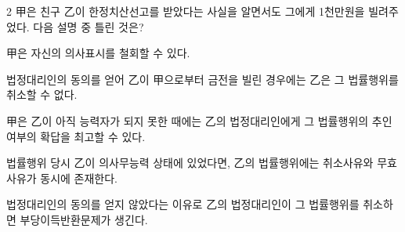 \begin{question}{2}
甲은 친구 乙이 한정치산선고를 받았다는 사실을 알면서도 그에게 1천만원을 빌려주었다. 다음 설명 중 틀린 것은?
\begin{choices}
  \item 甲은 자신의 의사표시를 철회할 수 있다.
  \item 법정대리인의 동의를 얻어 乙이 甲으로부터 금전을 빌린 경우에는 乙은 그 법률행위를 취소할 수 없다.
  \item 甲은 乙이 아직 능력자가 되지 못한 때에는 乙의 법정대리인에게 그 법률행위의 추인여부의 확답을 최고할 수 있다.
  \item 법률행위 당시 乙이 의사무능력 상태에 있었다면, 乙의 법률행위에는 취소사유와 무효사유가 동시에 존재한다.
  \item 법정대리인의 동의를 얻지 않았다는 이유로 乙의 법정대리인이 그 법률행위를 취소하면 부당이득반환문제가 생긴다.
\end{choices}
\end{question}
